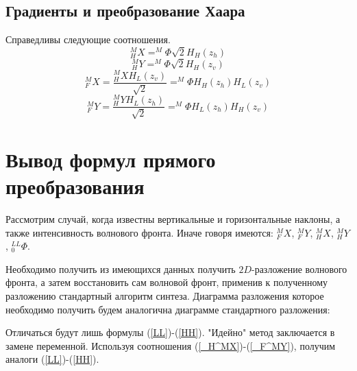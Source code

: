 \documentclass[oneside, final, 14pt]{article}
\begin{document}
\subsection{Градиенты и преобразование Хаара}
Справедливы следующие соотношения.
\begin{equation}\label{_H^MX}
_H^MX = ^M\Phi\sqrt{2}H_H(z_h) 
\end{equation}
\begin{equation}\label{_H^MY}
_H^MY = ^M\Phi\sqrt{2}H_H(z_v)
\end{equation}
\begin{equation}\label{_F^MX}
_F^MX = \frac{_H^MX H_L(z_v)}{\sqrt{2}}=^M\Phi H_H(z_h) H_L(z_v)
\end{equation}
\begin{equation}\label{_F^MY}
_F^MY = \frac{_H^MY H_L(z_h)}{\sqrt{2}}=^M\Phi H_L(z_h) H_H(z_v)
\end{equation}
\newpage
\section{Вывод формул прямого преобразования}
Рассмотрим случай, когда известны вертикальные и горизонтальные наклоны, а также интенсивность волнового фронта. Иначе говоря имеются: $_F^MX$, $_F^MY$, $_H^MX$, $_H^MY$ , $_0^{LL}\Phi$.

Необходимо получить из имеющихся данных получить $2D$-разложение волнового фронта, а затем восстановить сам волновой фронт, применив к полученному разложению стандартный алгоритм синтеза.\cite{new_method1}
Диаграмма разложения которое необходимо получить будем аналогична диаграмме стандартного разложения:
\begin{center}
\end{center}
Отличаться будут лишь формулы (\ref{LL})-(\ref{HH}). "Идейно" метод заключается в замене переменной. Используя соотношения (\ref{_H^MX})-(\ref{_F^MY}), получим аналоги (\ref{LL})-(\ref{HH}).
\end{document}
